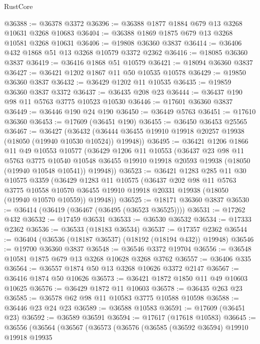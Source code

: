 \begin{lexlean}{RustCore}
\begin{coremodule}
@36388 := @36378 @3372
@36396 := @36388 @1877 @1884 @679 @13 @3268 @10631 @3268 @10683
@36404 := @36388 @1869 @1875 @679 @13 @3268 @10581 @3268 @10631
@36406 := @19808 @36360 @3837
@36414 := @36406 @432 @1868 @51 @13 @3268 @10579 @3372 @2362
@36416 := @18085 @36360 @3837
@36419 := @36416 @1868 @51 @10579
@36421 := @18094 @36360 @3837
@36427 := @36421 @1202 @1867 @11 @50 @10535 @10578
@36429 := @19850 @36360 @3837
@36432 := @36429 @1202 @11 @10535
@36435 := @19859 @36360 @3837 @3372
@36437 := @36435 @208 @23
@36444 := @36437 @190 @98 @11 @5763 @3775 @10523 @10530
@36446 := @17601 @36360 @3837
@36449 := @36446 @190 @24 @190
@36450 := @36449 @5763
@36451 := @17610 @36360
@36453 := @17609 (@36451 @190)
@36455 := @36450 @36453 @25565
@36467 := @36427
    (@36432 (@36444 @36455 @19910 @19918 @20257 @19938 (@18050 (@19940 @10530 @10524)) @19948))
@36495 := @36421
    @1206
    @1866
    @11
    @49
    @10553
    @10577
    (@36429
      @1206
      @11
      @10553
      (@36437
        @23
        @98
        @11
        @5763
        @3775
        @10540
        @10548
        @36455
        @19910
        @19918
        @20593
        @19938
        (@18050 (@19940 @10548 @10541))
        @19948))
@36523 := @36421
    @1283
    @285
    @11
    @30
    @10575
    @3359
    (@36429
      @1283
      @11
      @10575
      (@36437
        @202
        @98
        @11
        @5763
        @3775
        @10558
        @10570
        @36455
        @19910
        @19918
        @20331
        @19938
        (@18050 (@19940 @10570 @10559))
        @19948))
@36525 := @18171 @36360 @3837
@36530 := @36414 (@36419 (@36467 (@36495 (@36523 @36525))))
@36531 := @17262 @432
@36532 := @17459 @36531
@36533 := @36530 @36532
@36534 := @17333 @2362
@36536 := @36533 (@18183 @36534)
@36537 := @17357 @2362
@36544 := @36404 (@36536 (@18187 @36537) (@18192 (@18194 @432)) @19948)
@36546 := @19700 @36360 @3837
@36548 := @36546 @3372 @19704
@36556 := @36548 @10581 @1875 @679 @13 @3268 @10628 @3268 @3762
@36557 := @36406 @335
@36564 := @36557 @1874 @50 @13 @3268 @10626 @3372 @2147
@36567 := @36416 @1874 @50 @10626
@36573 := @36421 @1872 @1850 @11 @49 @10603 @10625
@36576 := @36429 @1872 @11 @10603
@36578 := @36435 @263 @23
@36585 := @36578 @62 @98 @11 @10583 @3775 @10588 @10598
@36588 := @36446 @23 @24 @23
@36589 := @36588 @10583
@36591 := @17609 (@36451 @23)
@36592 := @36589 @36591
@36594 := @17617 (@17618 @10583)
@36645 := @36556
    (@36564
      (@36567
        (@36573
          (@36576
            (@36585
              (@36592 @36594)
              @19910
              @19918
              @19935

\end{coremodule}
\end{lexlean}
